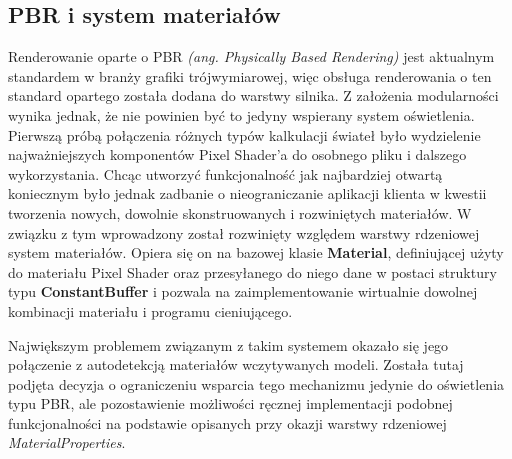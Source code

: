 \subsection{PBR i system materiałów}
Renderowanie oparte o PBR \textit{(ang. Physically Based Rendering)} jest aktualnym standardem w branży grafiki trójwymiarowej, więc obsługa renderowania o ten standard opartego została dodana do warstwy silnika. Z założenia modularności wynika jednak, że nie powinien być to jedyny wspierany system oświetlenia. Pierwszą próbą połączenia różnych typów kalkulacji świateł było wydzielenie najważniejszych komponentów Pixel Shader'a do osobnego pliku i dalszego wykorzystania. Chcąc utworzyć funkcjonalność jak najbardziej otwartą koniecznym było jednak zadbanie o nieograniczanie aplikacji klienta w kwestii tworzenia nowych, dowolnie skonstruowanych i rozwiniętych materiałów. W związku z tym wprowadzony został rozwinięty względem warstwy rdzeniowej system materiałów. Opiera się on na bazowej klasie \textbf{Material}, definiującej użyty do materiału Pixel Shader oraz przesyłanego do niego dane w postaci struktury typu \textbf{ConstantBuffer} i pozwala na zaimplementowanie wirtualnie dowolnej kombinacji materiału i programu cieniującego. 

Największym problemem związanym z takim systemem okazało się jego połączenie z autodetekcją materiałów wczytywanych modeli. Została tutaj podjęta decyzja o ograniczeniu wsparcia tego mechanizmu jedynie do oświetlenia typu PBR, ale pozostawienie możliwości ręcznej implementacji podobnej funkcjonalności na podstawie opisanych przy okazji warstwy rdzeniowej \textit{MaterialProperties}. 